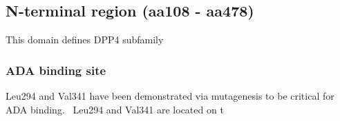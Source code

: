 \subsection{N-terminal region (aa108 - aa478)}

This domain defines DPP4 subfamily

\subsubsection{ADA binding site}
Leu294 and Val341 have been demonstrated via mutagenesis to be critical for ADA binding.~\cite{Abbott_1999} Leu294 and Val341 are located on t